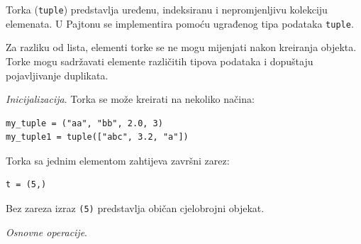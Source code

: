 Torka (\texttt{tuple}) predstavlja uređenu, indeksiranu i nepromjenljivu  kolekciju elemenata. U Pajtonu se implementira pomoću ugrađenog tipa podataka \texttt{tuple}.

Za razliku od lista, elementi torke se ne mogu mijenjati nakon kreiranja objekta. Torke mogu sadržavati elemente različitih tipova podataka i dopuštaju pojavljivanje duplikata.

\textit{Inicijalizacija}. Torka se može kreirati na nekoliko načina:

\begin{verbatim}
my_tuple = ("aa", "bb", 2.0, 3)
my_tuple1 = tuple(["abc", 3.2, "a"])
\end{verbatim}

Torka sa jednim elementom zahtijeva završni zarez:

\begin{verbatim}
t = (5,)
\end{verbatim}

Bez zareza izraz \texttt{(5)} predstavlja običan cjelobrojni objekat.

\textit{Osnovne operacije}. 

